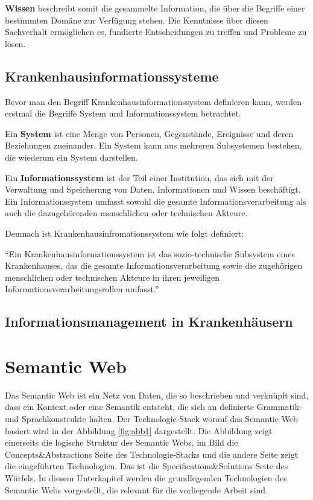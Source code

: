 \textbf{Wissen} beschreibt somit die gesammelte Information, die über die Begriffe einer bestimmten Domäne zur Verfügung stehen. 
Die Kenntnisse über diesen Sachverhalt ermöglichen es, fundierte Entscheidungen zu treffen und Probleme zu lösen.

\subsection{Krankenhausinformationssysteme}

Bevor man den Begriff Krankenhausinformationssystem definieren kann, werden erstmal die Begriffe System und Informationssystem betrachtet. \newline

Ein \textbf{System} ist eine Menge von Personen, Gegenstände, Ereignisse und deren Beziehungen zueinander. 
Ein System kann aus mehreren Subsystemen bestehen, die wiederum ein System darstellen. \citep[vgl.]{winter_health_2011} \newline

Ein \textbf{Informationssystem} ist der Teil einer Institution, das sich mit der Verwaltung und Speicherung von Daten, Informationen und Wissen beschäftigt.
Ein Informationssystem umfasst sowohl die gesamte Informationsverarbeitung als auch die dazugehörenden menschlichen oder technischen Akteure. \citep[vgl.]{winter_health_2011} \newline

Demnach ist Krankenhausinfromationssystem wie folgt definiert:

\begin{definition}
	\enquote{Ein Krankenhausinformationssystem ist das sozio-technische Subsystem eines Krankenhauses, das die gesamte Informationsverarbeitung sowie die zugehörigen menschlichen oder technischen Akteure in ihren jeweiligen Informationsverarbeitungsrollen umfasst.} \citep{winter_health_2011}
\end{definition}

\subsection{Informationsmanagement in Krankenhäusern}



\section{Semantic Web}\label{sec:sw}

Das Semantic Web ist ein Netz von Daten, die so beschrieben und verknüpft sind, dass ein Kontext oder eine Semantik entsteht, die sich an definierte Grammatik- und Sprachkonstrukte halten. \citep[vgl.]{hebeler_semantic_2009}
Der Technologie-Stack worauf das Semantic Web basiert wird in der Abbildung \ref{fig:abb1} dargestellt.
Die Abbildung zeigt einerseits die logische Struktur des Semantic Webs, im Bild die Concepts\&Abstractions Seite des Technologie-Stacks und die andere Seite zeigt die eingeführten Technologien.
Das ist die Specifications\&Solutions Seite des Würfels.
In diesem Unterkapitel werden die grundlegenden Technologien des Semantic Webs vorgestellt, die relevant für die vorliegende Arbeit sind.

